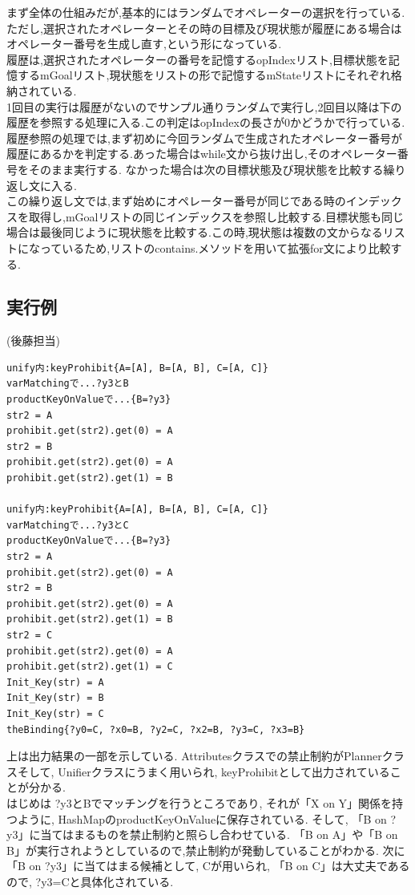 \documentclass[uplatex,12pt]{jsarticle}
\begin{document}
まず全体の仕組みだが,基本的にはランダムでオペレーターの選択を行っている.ただし,選択されたオペレーターとその時の目標及び現状態が履歴にある場合はオペレーター番号を生成し直す,という形になっている.\\
履歴は,選択されたオペレーターの番号を記憶するopIndexリスト,目標状態を記憶するmGoalリスト,現状態をリストの形で記憶するmStateリストにそれぞれ格納されている.\\
1回目の実行は履歴がないのでサンプル通りランダムで実行し,2回目以降は下の履歴を参照する処理に入る.この判定はopIndexの長さが0かどうかで行っている.\\
履歴参照の処理では,まず初めに今回ランダムで生成されたオペレーター番号が履歴にあるかを判定する.あった場合はwhile文から抜け出し,そのオペレーター番号をそのまま実行する.
なかった場合は次の目標状態及び現状態を比較する繰り返し文に入る.\\
この繰り返し文では,まず始めにオペレーター番号が同じである時のインデックスを取得し,mGoalリストの同じインデックスを参照し比較する.目標状態も同じ場合は最後同じように現状態を比較する.この時,現状態は複数の文からなるリストになっているため,リストのcontains.メソッドを用いて拡張for文により比較する.

\subsection{実行例}
\noindent (後藤担当) \\
\begin{lstlisting}
unify内:keyProhibit{A=[A], B=[A, B], C=[A, C]}
varMatchingで...?y3とB
productKeyOnValueで...{B=?y3}
str2 = A
prohibit.get(str2).get(0) = A
str2 = B
prohibit.get(str2).get(0) = A
prohibit.get(str2).get(1) = B

unify内:keyProhibit{A=[A], B=[A, B], C=[A, C]}
varMatchingで...?y3とC
productKeyOnValueで...{B=?y3}
str2 = A
prohibit.get(str2).get(0) = A
str2 = B
prohibit.get(str2).get(0) = A
prohibit.get(str2).get(1) = B
str2 = C
prohibit.get(str2).get(0) = A
prohibit.get(str2).get(1) = C
Init_Key(str) = A
Init_Key(str) = B
Init_Key(str) = C
theBinding{?y0=C, ?x0=B, ?y2=C, ?x2=B, ?y3=C, ?x3=B}
\end{lstlisting}
上は出力結果の一部を示している. Attributesクラスでの禁止制約がPlannerクラスそして, Unifierクラスにうまく用いられ, keyProhibitとして出力されていることが分かる.\\
はじめは {?y3とB}でマッチングを行うところであり, それが「X on Y」関係を持つように, HashMapのproductKeyOnValueに保存されている. そして, 「B on ?y3」に当てはまるものを禁止制約と照らし合わせている. 「B on A」や「B on B」が実行されようとしているので,禁止制約が発動していることがわかる. 次に「B on ?y3」に当てはまる候補として, Cが用いられ, 「B on C」は大丈夫であるので, {?y3=C}と具体化されている.
\end{document}
